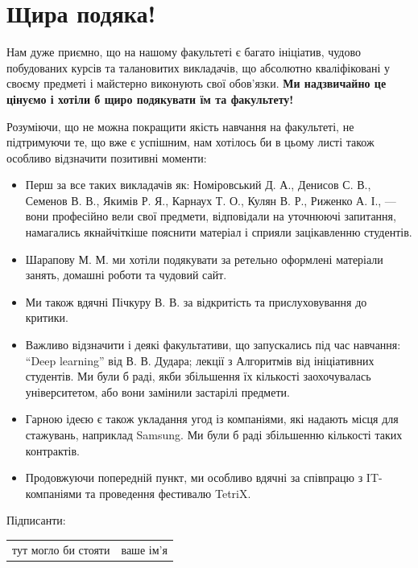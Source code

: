 \documentclass[14pt, a4paper]{extarticle}  %
\begin{document}
\newpage
\section{Щира подяка!}
Нам дуже приємно, що на нашому факультеті є багато ініціатив, чудово побудованих курсів та талановитих викладачів, що абсолютно кваліфіковані у своєму предметі і майстерно виконують свої обов'язки. \textbf{Ми надзвичайно це цінуємо і хотіли б щиро подякувати їм та факультету! }\medskip

Розуміючи, що не можна покращити якість навчання на факультеті, не підтримуючи те, що вже є успішним, нам хотілось би в цьому листі також особливо  відзначити позитивні моменти:
\begin{itemize}
    \item Перш за все таких викладачів як: Номіровський Д. А., Денисов С. В., Семенов В. В., Якимів Р. Я., Карнаух Т. О., Кулян В. Р., Риженко А. І., --- вони професійно вели свої предмети, відповідали на уточнюючі запитання, намагались якнайчіткіше пояснити матеріал і сприяли зацікавленню студентів. 

\item Шарапову М. М.  ми хотіли подякувати за ретельно оформлені матеріали занять, домашні роботи та чудовий сайт. 

\item Ми також вдячні Пічкуру В. В. за відкритість та прислуховування до критики.

\item Важливо відзначити і деякі факультативи, що запускались під час навчання: ``Deep learning'' від В. В. Дудара; лекції з Алгоритмів від ініціативних студентів. Ми були б раді, якби збільшення їх кількості заохочувалась університетом, або вони замінили застарілі предмети.

\item Гарною ідеєю є також укладання угод із компаніями, які надають місця для стажувань, наприклад Samsung. Ми були б раді збільшенню кількості таких контрактів.

\item Продовжуючи попередній пункт, ми особливо вдячні за співпрацю з IT-компаніями та проведення фестивалю TetriX. 
\end{itemize}

\newpage
Підписанти:

\begin{tabular}{c|c}
\hline
тут могло би стояти & ваше ім'я \\
\end{tabular}
\end{document}

